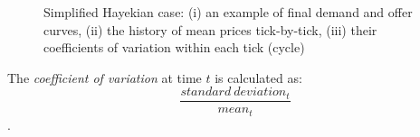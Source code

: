 \documentclass[10pt]{report}
\begin{document}
\begin{figure}[H]
\begin{center}
\caption{Simplified Hayekian case: (i) an example of final demand and offer curves, (ii) the history of mean prices tick-by-tick, (iii) their coefficients of variation within each tick (cycle)}
\label{output_3_2.png}
\end{center}
\end{figure}

The \emph{coefficient of variation} at time $t$ is calculated as: $$\frac{standard~deviation_t}{mean_t}$$.
\end{document}
